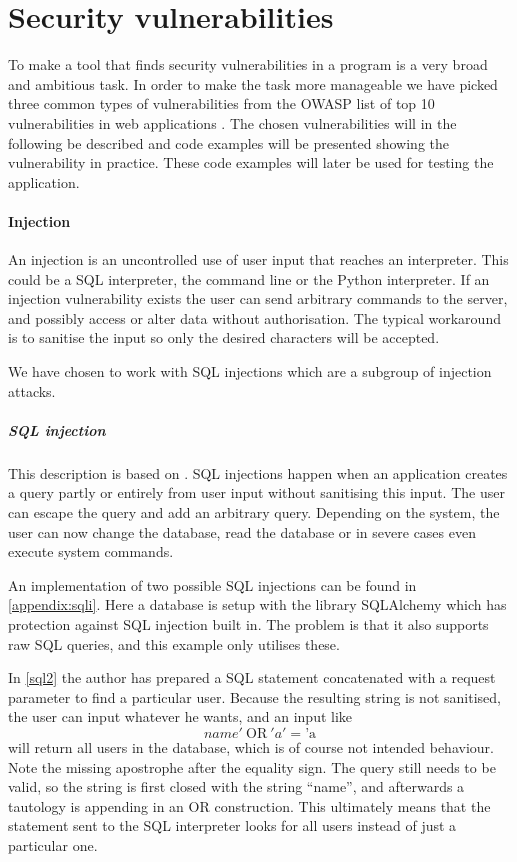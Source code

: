 \section{Security vulnerabilities}

To make a tool that finds security vulnerabilities in a program is a very broad and ambitious task.
In order to make the task more manageable we have picked three common types of vulnerabilities from the OWASP list of top 10 vulnerabilities in web applications \cite{OWASP10}.
The chosen vulnerabilities will in the following be described and code examples will be presented showing the vulnerability in practice.
These code examples will later be used for testing the application.

\paragraph{Injection}
An injection is an uncontrolled use of user input that reaches an interpreter.
This could be a SQL interpreter, the command line or the Python interpreter.
If an injection vulnerability exists the user can  send arbitrary commands to the server, and possibly access or alter data without authorisation.
The typical workaround is to sanitise the input so only the desired characters will be accepted. \citep{OWASPTOP10PDF}

We have chosen to work with SQL injections which are a subgroup of injection attacks.

\subparagraph{SQL injection}
This description is based on \citet{sqlinjection}.
SQL injections happen when an application creates a query partly or entirely from user input without sanitising this input.
The user can escape the query and add an arbitrary query.
Depending on the system, the user can now change the database, read the database or in severe cases even execute system commands.

An implementation of two possible SQL injections can be found in \cref{appendix:sqli}.
Here a database is setup with the library SQLAlchemy which has protection against SQL injection built in.
The problem is that it also supports raw SQL queries, and this example only utilises these.

In \cref{sql2} the author has prepared a SQL statement concatenated with a request parameter to find a particular user.
Because the resulting string is not sanitised, the user can input whatever he wants, and an input like
\[ name' ~ \text{OR} ~ 'a' = \text{'a} \]
will return all users in the database, which is of course not intended behaviour.
Note the missing apostrophe after the equality sign.
The query still needs to be valid, so the string is first closed with the string ``name'', and afterwards a tautology is appending in an OR construction.
This ultimately means that the statement sent to the SQL interpreter looks for all users instead of just a particular one.

